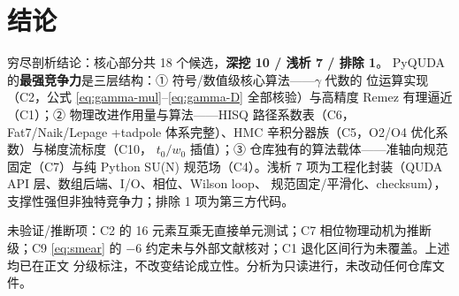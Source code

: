 \documentclass[UTF8]{ctexart}
\begin{document}
\section{结论}

\begin{conclbox}
穷尽剖析结论：核心部分共 18 个候选，\textbf{深挖 10 / 浅析 7 / 排除 1}。
PyQUDA 的\textbf{最强竞争力}是三层结构：① 符号/数值级核心算法——$\gamma$ 代数的
位运算实现（C2，公式 \eqref{eq:gamma-mul}--\eqref{eq:gamma-D} 全部核验）与高精度
Remez 有理逼近（C1）；② 物理改进作用量与算法——HISQ 路径系数表（C6，Fat7/Naik/Lepage
+tadpole 体系完整）、HMC 辛积分器族（C5，O2/O4 优化系数）与梯度流标度（C10，
$t_0/w_0$ 插值）；③ 仓库独有的算法载体——准轴向规范固定（C7）与纯 Python SU(N)
规范场（C4）。浅析 7 项为工程化封装（QUDA API 层、数组后端、I/O、相位、Wilson loop、
规范固定/平滑化、checksum），支撑性强但非独特竞争力；排除 1 项为第三方代码。
\end{conclbox}

\begin{warnbox}
未验证/推断项：C2 的 16 元素互乘无直接单元测试；C7 相位物理动机为推断级；C9
\eqref{eq:smear} 的 $-6$ 约定未与外部文献核对；C1 退化区间行为未覆盖。上述均已在正文
分级标注，不改变结论成立性。分析为只读进行，未改动任何仓库文件。
\end{warnbox}
\end{document}
